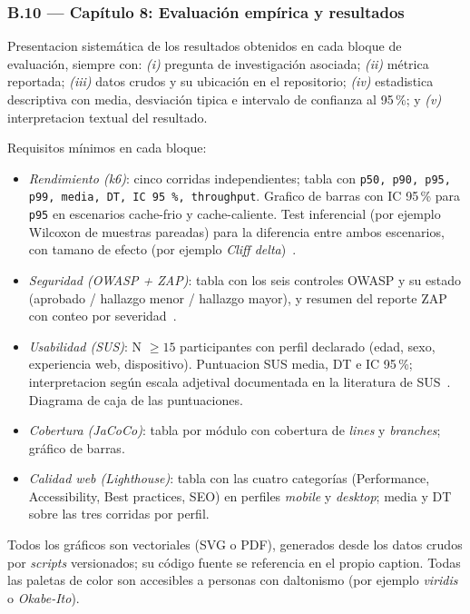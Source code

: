 \documentclass[11pt,a4paper]{article}
\begin{document}
\subsubsection*{B.10 --- Cap\'{i}tulo 8: Evaluaci\'{o}n emp\'{i}rica y resultados}

Presentacion sistem\'{a}tica de los resultados obtenidos en cada bloque de evaluaci\'{o}n, siempre con: \emph{(i)} pregunta de investigaci\'{o}n asociada; \emph{(ii)} m\'{e}trica reportada; \emph{(iii)} datos crudos y su ubicaci\'{o}n en el repositorio; \emph{(iv)} estadistica descriptiva con media, desviaci\'{o}n tipica e intervalo de confianza al 95\,\%; y \emph{(v)} interpretacion textual del resultado.

Requisitos m\'{i}nimos en cada bloque:

\begin{itemize}
    \item \emph{Rendimiento (k6)}: cinco corridas independientes; tabla con \texttt{p50, p90, p95, p99, media, DT, IC 95\,\%, throughput}. Grafico de barras con IC 95\,\% para \texttt{p95} en escenarios cache-frio y cache-caliente. Test inferencial (por ejemplo Wilcoxon de muestras pareadas) para la diferencia entre ambos escenarios, con tamano de efecto (por ejemplo \emph{Cliff delta})~\cite{wohlin2012experimentation}.
    \item \emph{Seguridad (OWASP + ZAP)}: tabla con los seis controles OWASP y su estado (aprobado / hallazgo menor / hallazgo mayor), y resumen del reporte ZAP con conteo por severidad~\cite{owasp2021top10}.
    \item \emph{Usabilidad (SUS)}: N $\geq 15$ participantes con perfil declarado (edad, sexo, experiencia web, dispositivo). Puntuacion SUS media, DT e IC 95\,\%; interpretacion seg\'{u}n escala adjetival documentada en la literatura de SUS~\cite{brooke1996sus}. Diagrama de caja de las puntuaciones.
    \item \emph{Cobertura (JaCoCo)}: tabla por m\'{o}dulo con cobertura de \emph{lines} y \emph{branches}; gr\'{a}fico de barras.
    \item \emph{Calidad web (Lighthouse)}: tabla con las cuatro categor\'{i}as (Performance, Accessibility, Best practices, SEO) en perfiles \emph{mobile} y \emph{desktop}; media y DT sobre las tres corridas por perfil.
\end{itemize}

Todos los gr\'{a}ficos son vectoriales (SVG o PDF), generados desde los datos crudos por \emph{scripts} versionados; su c\'{o}digo fuente se referencia en el propio caption. Todas las paletas de color son accesibles a personas con daltonismo (por ejemplo \emph{viridis} o \emph{Okabe-Ito}).
\end{document}

